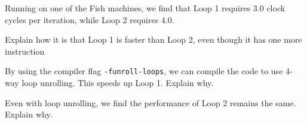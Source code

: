\begin{problem}{9}
Running on one of the Fish machines, we find that Loop 1 requires
3.0 clock cycles per iteration, while Loop 2 requires 4.0.

\begin{choice}
\item
Explain how it is that Loop 1 is faster than Loop 2, even though it
has one more instruction
\item
By using the compiler flag {\tt -funroll-loops}, we can compile the
code to use 4-way loop unrolling.  This speeds up Loop 1.  Explain why.
\item
Even with loop unrolling, we find the performance of Loop 2 remains the same.  Explain why.
\end{choice}


\end{problem}